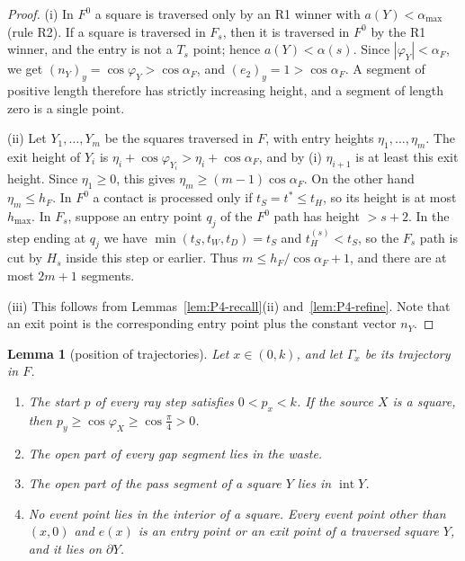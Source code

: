 \documentclass[11pt]{amsart}
\newcommand{\amax}{\alpha_{\max}}
\newcommand{\hmax}{h_{\max}}
\newcommand{\Fz}{F^{0}}
\newcommand{\Fs}{F_{s}}
\newtheorem{lemma}[theorem]{Lemma}
\theoremstyle{definition}
\theoremstyle{remark}
\numberwithin{equation}{section}
\begin{document}
\begin{proof}
(i) In $\Fz$ a square is traversed only by an R1 winner with $a(Y)<\amax$ (rule R2). If a square is traversed in $\Fs$, then it is traversed in $\Fz$ by the R1 winner, and the entry is not a $T_s$ point; hence $a(Y)<\alpha(s)$. Since $|\varphi_Y|<\alpha_F$, we get $(n_Y)_y=\cos\varphi_Y>\cos\alpha_F$, and $(e_2)_y=1>\cos\alpha_F$. A segment of positive length therefore has strictly increasing height, and a segment of length zero is a single point.

(ii) Let $Y_1,\dots,Y_m$ be the squares traversed in $F$, with entry heights $\eta_1,\dots,\eta_m$. The exit height of $Y_i$ is $\eta_i+\cos\varphi_{Y_i}>\eta_i+\cos\alpha_F$, and by (i) $\eta_{i+1}$ is at least this exit height. Since $\eta_1\ge0$, this gives $\eta_m\ge(m-1)\cos\alpha_F$. On the other hand $\eta_m\le h_F$. In $\Fz$ a contact is processed only if $t_S=t^*\le t_H$, so its height is at most $\hmax$. In $\Fs$, suppose an entry point $q_j$ of the $\Fz$ path has height $>s+2$. In the step ending at $q_j$ we have $\min(t_S,t_W,t_D)=t_S$ and $t^{(s)}_H<t_S$, so the $\Fs$ path is cut by $H_s$ inside this step or earlier. Thus $m\le h_F/\cos\alpha_F+1$, and there are at most $2m+1$ segments.

(iii) This follows from Lemmas~\ref{lem:P4-recall}(ii) and~\ref{lem:P4-refine}. Note that an exit point is the corresponding entry point plus the constant vector $n_Y$.
\end{proof}

\begin{lemma}[position of trajectories]\label{lem:P4-position}
Let $x\in(0,k)$, and let $\Gamma_x$ be its trajectory in $F$.
\begin{enumerate}
\item[(0)] The start $p$ of every ray step satisfies $0<p_x<k$. If the source $X$ is a square, then $p_y\ge\cos\varphi_X\ge\cos\frac\pi4>0$.
\item[(i)] The open part of every gap segment lies in the waste.
\item[(ii)] The open part of the pass segment of a square $Y$ lies in $\operatorname{int}Y$.
\item[(iii)] No event point lies in the interior of a square. Every event point other than $(x,0)$ and $e(x)$ is an entry point or an exit point of a traversed square $Y$, and it lies on $\partial Y$.
\end{enumerate}
\end{lemma}
\end{document}
